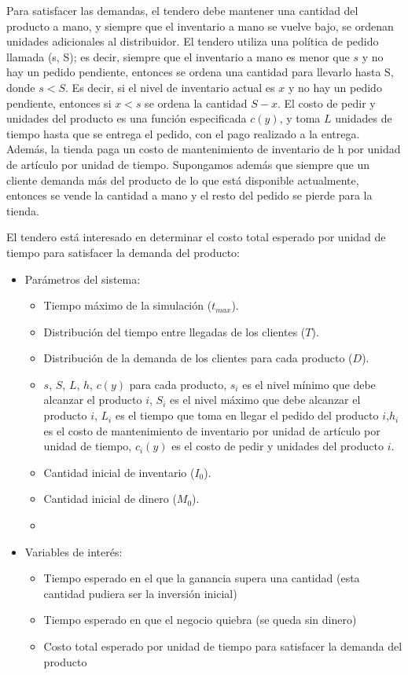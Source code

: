 \documentclass{article}
\begin{document}
Para satisfacer las demandas, el tendero debe mantener una cantidad del producto a mano, y siempre que el inventario a
mano se vuelve bajo, se ordenan unidades adicionales al distribuidor. El tendero utiliza una política de pedido
llamada (s, S); es decir, siempre que el inventario a mano es menor que $s$ y no hay un pedido pendiente, entonces se
ordena una cantidad para llevarlo hasta S, donde $s<S$. Es decir, si el nivel de inventario actual es $x$ y no hay un
pedido pendiente, entonces si $x<s$ se ordena la cantidad $S-x$.
El costo de pedir y unidades del producto es una función especificada $c(y)$, y toma $L$ unidades de tiempo hasta que se
entrega el pedido, con el pago realizado a la entrega. Además, la tienda paga un costo de mantenimiento de inventario de
h por unidad de artículo por unidad de tiempo.
Supongamos además que siempre que un cliente demanda más del producto de lo que está disponible actualmente, entonces se
vende la cantidad a mano y el resto del pedido se pierde para la tienda.

El tendero está interesado en determinar el costo total esperado por unidad de tiempo para satisfacer la demanda del
producto:


\begin{itemize}
     
    \item Parámetros del sistema:
    \begin{itemize}
        \item  Tiempo máximo de la simulación ($t_{max}$).
        \item  Distribución del tiempo entre llegadas de los clientes ($T$).
        \item  Distribución de la demanda de los clientes para cada producto ($D$).
        \item  $s$, $S$, $L$, $h$, $c(y)$ para cada producto, $s_i$ es el nivel mínimo que debe alcanzar el producto $i$, $S_i$ es el nivel máximo que debe alcanzar el producto $i$, $L_i$ es el tiempo que toma en llegar el pedido del producto $i$,$h_i$ es el costo de mantenimiento de inventario por unidad de artículo por unidad de tiempo, $c_i(y)$ es el costo de pedir y unidades del producto $i$.
        \item Cantidad inicial de inventario ($I_0$).
        \item Cantidad inicial de dinero ($M_0$).
    \item \end{itemize}
    

    \item Variables de interés:
    \begin{itemize}
        \item Tiempo esperado en el que la ganancia supera una cantidad  (esta cantidad pudiera ser la inversión inicial)
        \item Tiempo esperado en que el negocio quiebra (se queda sin dinero)
        \item Costo total esperado por unidad de tiempo para satisfacer la demanda del producto
    \end{itemize}
\end{itemize}
\end{document}

